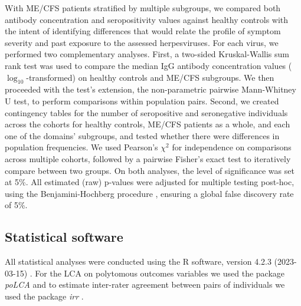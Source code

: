 With ME/CFS patients stratified by multiple subgroups,
we compared both antibody concentration and seropositivity values against healthy controls with the intent of identifying differences that would relate the profile of symptom severity 
and past exposure to the assessed herpesviruses.
For each virus, we performed two complementary analyses.
First, a two-sided Kruskal-Wallis sum rank test was used to compare the median IgG antibody concentration values (${\log_{10}}$-transformed) on healthy controls and ME/CFS subgroups.
We then proceeded with the test's extension, the non-parametric pairwise Mann-Whitney U test, to perform comparisons within population pairs.
Second, we created contingency tables for the number of seropositive and seronegative individuals across the cohorts for healthy controls, ME/CFS patients as a whole, and each one of the domains' subgroups, and tested whether there were differences in population frequencies.
We used Pearson's $\chi^2$ for independence on comparisons across multiple cohorts, followed by a pairwise Fisher's exact test to iteratively compare between two groups.
On both analyses, the level of significance was set at 5\%.
All estimated (raw) p-values were adjusted for multiple testing post-hoc, using the Benjamini-Hochberg procedure \citep{benjaminiControllingFalseDiscovery1995}, ensuring a global false discovery rate of 5\%.


\subsection{Statistical software}

All statistical analyses were conducted using the R software, version 4.2.3 (2023-03-15) \citep{rcoreteamLanguageEnvironmentStatistical2020}.
For the LCA on polytomous outcomes variables we used the package \textit{poLCA} \citep{linzer2011PoLCAPackage} 
and to estimate inter-rater agreement between pairs of individuals we used the package \textit{irr} \citep{gamer2012irr}.


